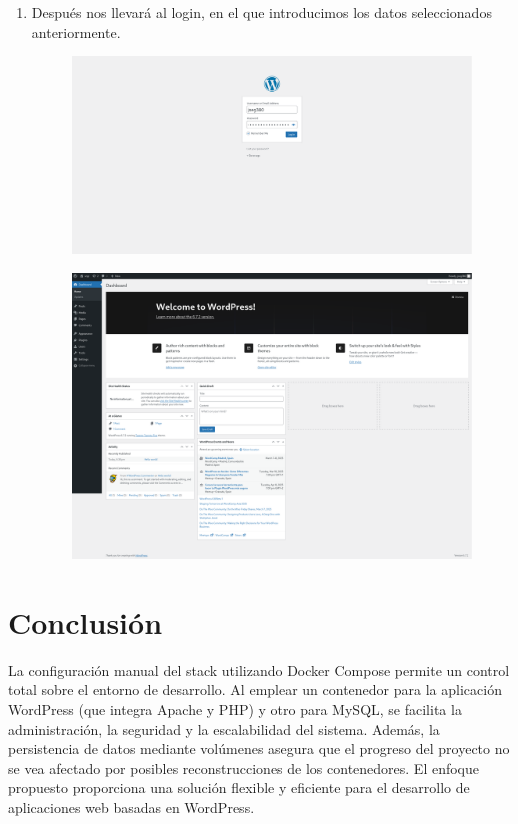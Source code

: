 \documentclass[a4paper]{article}
\begin{document}
\begin{enumerate}
    \item Después nos llevará al login, en el que introducimos los datos seleccionados anteriormente.
    \begin{figure}[!h]
        \centering
        \includegraphics[width=0.8\linewidth]{images/wp_install4.png}
    \end{figure}
    \begin{figure}[!h]
        \centering
        \includegraphics[width=0.8\linewidth]{images/wp_install5.png}
    \end{figure}
        
\end{enumerate}


\section{Conclusión}

La configuración manual del stack utilizando Docker Compose permite un control total sobre el entorno de desarrollo. Al emplear un contenedor para la aplicación WordPress (que integra Apache y PHP) y otro para MySQL, se facilita la administración, la seguridad y la escalabilidad del sistema. Además, la persistencia de datos mediante volúmenes asegura que el progreso del proyecto no se vea afectado por posibles reconstrucciones de los contenedores. El enfoque propuesto proporciona una solución flexible y eficiente para el desarrollo de aplicaciones web basadas en WordPress.
\end{document}
